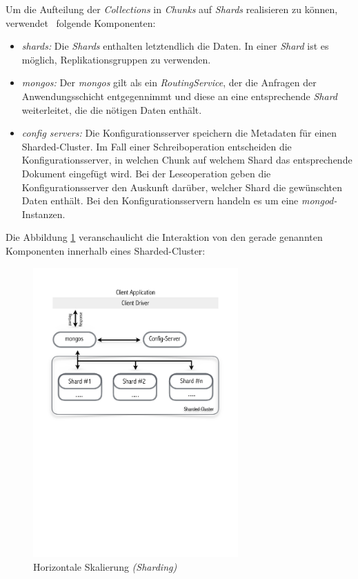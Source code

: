 Um die Aufteilung der \textit{Collections} in \textit{Chunks} auf \textit{Shards} realisieren zu können, verwendet \mongo\ folgende Komponenten:
\begin{itemize}
\item \textit{shards:} Die \textit{Shards} enthalten letztendlich die Daten. In einer \textit{Shard} ist es möglich, Replikationsgruppen zu verwenden.
\item \textit{mongos:} Der \textit{mongos} gilt als ein \textit{RoutingService}, der die Anfragen der Anwendungsschicht entgegennimmt und diese an eine entsprechende \textit{Shard} weiterleitet, die die nötigen Daten enthält.
\item \textit{config servers:} Die Konfigurationsserver speichern die Metadaten für einen Sharded-Cluster. Im Fall einer Schreiboperation entscheiden die Konfigurationsserver, in welchen Chunk auf welchem Shard das entsprechende Dokument eingefügt wird. Bei der Leseoperation geben die Konfigurationsserver den Auskunft darüber, welcher Shard die gewünschten Daten enthält. Bei den Konfigurationsservern handeln es um eine \textit{mongod-}Instanzen.
\end{itemize}
Die Abbildung \ref{img:shardedCluster} veranschaulicht die Interaktion von den gerade genannten Komponenten innerhalb eines Sharded-Cluster:
\begin{figure}[H]
\centering
\includegraphics[trim = 0mm 139mm 0mm 22mm, clip, width=0.7\textwidth]{resources/replicaSet/shardedCluster}
\caption[Horizontale Skalierung \textit{(Sharding)}]{Horizontale Skalierung \textit{(Sharding)}}
\label{img:shardedCluster}
\end{figure}

